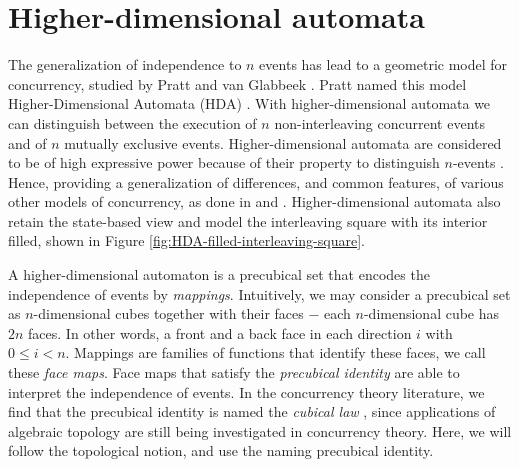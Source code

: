 \section{Higher-dimensional automata}
\label{sec:higher-dimensional-automata}

    
    The generalization of independence to $n$ events has lead to a geometric model for concurrency, studied by Pratt and van Glabbeek \cite{pratt91hda, Pratt00Sculptures, Glabbeek06HDA}. Pratt named this model Higher-Dimensional Automata (HDA) \cite{pratt91hda}. With higher-dimensional automata we can distinguish between the execution of $n$ non-interleaving concurrent events and of $n$ mutually exclusive events. Higher-dimensional automata are considered to be of high expressive power because of their property to distinguish $n$-events \cite{Kahl2013TheHG}. Hence, providing a generalization of differences, and common features, of various other models of concurrency, as done in \cite{Glabbeek06HDA} and \cite{Goubault18RelationshipsModelsForConcurrency}. Higher-dimensional automata also retain the state-based view and model the interleaving square with its interior filled, shown in Figure \ref{fig:HDA-filled-interleaving-square}. 
    
    
   A higher-dimensional automaton is a precubical set that encodes the independence of events by \emph{mappings}. Intuitively, we may consider a precubical set as $n$-dimensional cubes \cite{Fajstrup16DirectedAlgebraicTopologyConcurrency} together with their faces $-$ each $n$-dimensional cube has $2n$ faces. In other words, a front and a back face in each direction $i$ with $0 \leq i < n$. Mappings are families of functions that identify these faces, we call these \emph{face maps}. Face maps that satisfy the \emph{precubical identity} \cite{Fahrenberg05PhD, Fajstrup05DipathsInCubicalComplex, Fajstrup06AlgebraicTopologyConcurrency, Goubault2001TopologicalDeformHDA, goubault2003SomeGeometricPerspectives} are able to interpret the independence of events. In the concurrency theory literature, we find that the precubical identity is named the \emph{cubical law} \cite{Glabbeek06HDA, Johansen16STstruct}, since applications of algebraic topology are still being investigated in concurrency theory. Here, we will follow the topological notion, and use the naming precubical identity.

